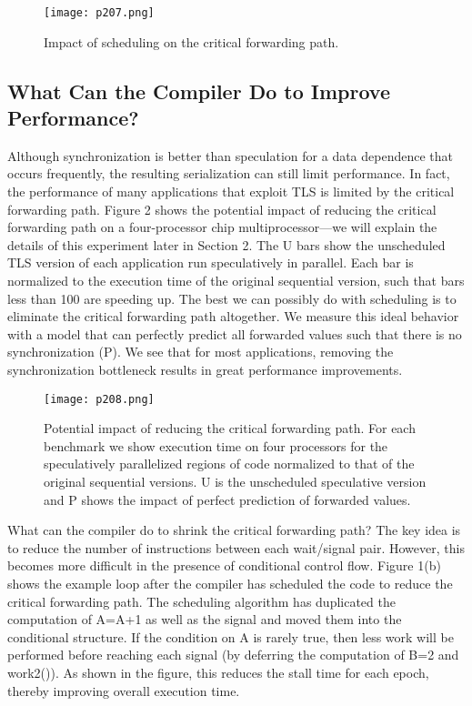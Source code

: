 \begin{figure}[H]
	\centering
	\texttt{[image: p207.png]}
	\caption{ Impact of scheduling on the critical forwarding path.}
	\label{fig:p207}
\end{figure}

\subsection{What Can the Compiler Do to Improve Performance?\cite{zhai2002compiler}}


Although synchronization is better than speculation for a data dependence that occurs frequently, the resulting serialization can still
limit performance. In fact, the performance of many applications
that exploit TLS is limited by the critical forwarding path. Figure 2
shows the potential impact of reducing the critical forwarding path
on a four-processor chip multiprocessor—we will explain the details of this experiment later in Section 2. The U bars show the
unscheduled TLS version of each application run speculatively in
parallel. Each bar is normalized to the execution time of the original sequential version, such that bars less than 100 are speeding
up. The best we can possibly do with scheduling is to eliminate
the critical forwarding path altogether. We measure this ideal behavior with a model that can perfectly predict all forwarded values
such that there is no synchronization (P). We see that for most applications, removing the synchronization bottleneck results in great
performance improvements.


\begin{figure}[H]
	\centering
	\texttt{[image: p208.png]}
	\caption{Potential impact of reducing the critical forwarding path. For each benchmark we show execution time on four processors for the speculatively parallelized regions of code normalized to that of the original sequential versions. U is the unscheduled
    speculative version and P shows the impact of perfect prediction of forwarded values.}
	\label{fig:p208}
\end{figure}


What can the compiler do to shrink the critical forwarding path?
The key idea is to reduce the number of instructions between each
wait/signal pair. However, this becomes more difficult in the
presence of conditional control flow. Figure 1(b) shows the example loop after the compiler has scheduled the code to reduce the
critical forwarding path. The scheduling algorithm has duplicated
the computation of A=A+1 as well as the signal and moved them
into the conditional structure. If the condition on A is rarely true,
then less work will be performed before reaching each signal (by
deferring the computation of B=2 and work2()). As shown in the
figure, this reduces the stall time for each epoch, thereby improving
overall execution time. 



